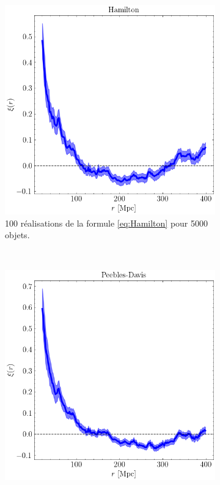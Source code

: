 \documentclass{article}
\numberwithin{equation}{section}
\begin{document}
\begin{figure}[H]
        \centering
        \begin{subfigure}[t]{0.3\textwidth}
                \includegraphics[width=\textwidth]{coorelation_Hamilton}
                \caption{100 réalisations de la formule \eqref{eq:Hamilton} pour 5000 objets.}
                \label{fig:Hamilton}
        \end{subfigure}
        ~
        \begin{subfigure}[t]{0.3\textwidth}
                \includegraphics[width=\textwidth]{coorelation_Peebles-Davis}

\end{subfigure}
\end{figure}
\end{document}
